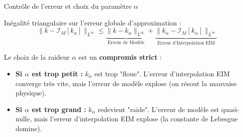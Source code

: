 \documentclass[aspectratio=169]{beamer}
\begin{document}
\begin{frame}{Contrôle de l'erreur et choix du paramètre $\alpha$}

Inégalité triangulaire sur l'erreur globale d'approximation :
\[
\| k - \mathcal{I}_M[k_\alpha] \|_{L^\infty} \leq \underbrace{\| k - k_\alpha \|_{L^\infty}}_{\text{Erreur de Modèle}} + \underbrace{\| k_\alpha - \mathcal{I}_M[k_\alpha] \|_{L^\infty}}_{\text{Erreur d'Interpolation EIM}}
\]

\pause
\vspace{0.4cm}
Le choix de la raideur $\alpha$ est un \textbf{compromis strict} :
\begin{itemize}
    \item \textbf{Si $\alpha$ est trop petit :} $k_\alpha$ est trop "floue". L'erreur d'interpolation EIM converge très vite, mais l'erreur de modèle explose (on résout la mauvaise physique).
    \item \textbf{Si $\alpha$ est trop grand :} $k_\alpha$ redevient "raide". L'erreur de modèle est quasi-nulle, mais l'erreur d'interpolation EIM explose (la constante de Lebesgue domine).
\end{itemize}

\end{frame}
\end{document}
